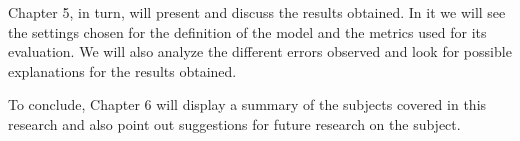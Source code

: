 Chapter 5, in turn, will present and discuss the results obtained. In it we will see the settings chosen for the definition of the model and the metrics used for its evaluation. We will also analyze the different errors observed and look for possible explanations for the results obtained.

To conclude, Chapter 6 will display a summary of the subjects covered in this research and also point out suggestions for future research on the subject.




